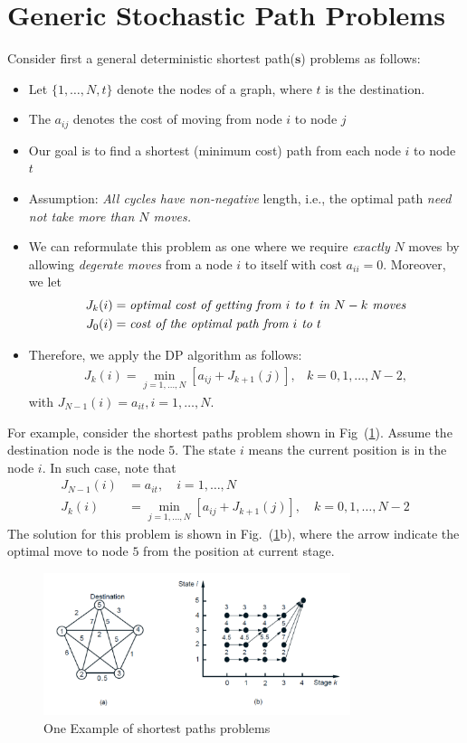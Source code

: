 \section{Generic Stochastic Path Problems}
Consider first a general deterministic shortest path($\bm s$) problems as follows:
\begin{itemize}
\item
Let $\{1,\dots,N,t\}$ denote the nodes of a graph, where $t$ is the destination.
\item
The $a_{ij}$ denotes the cost of moving from node $i$ to node $j$
\item
Our goal is to find a shortest (minimum cost) path from each node $i$ to node $t$
\item
Assumption: \emph{All cycles have non-negative} length, i.e., the optimal path \emph{need not take more than $N$ moves.}
\item
We can reformulate this problem as one where we require \emph{exactly} $N$ moves by allowing \emph{degerate moves} from a node $i$ to itself with cost $a_{ii}=0$. Moreover, we let
\begin{align*}
J_k(i)&=\emph{optimal cost of getting from $i$ to $t$ in $N-k$ moves}\\
J_0(i)&=\emph{cost of the optimal path from $i$ to $t$}
\end{align*}
\item
Therefore, we apply the DP algorithm as follows:
\[
\begin{array}{ll}
J_k(i)=\min_{j=1,\dots,N}\left[a_{ij} + J_{k+1}(j)\right],
&
k=0,1,\dots,N-2,
\end{array}
\]
with $J_{N-1}(i) = a_{it}, i=1,\dots,N$.
\end{itemize}

For example, consider the shortest paths problem shown in Fig~(\ref{fig:2:2}). Assume the destination node is the node $5$. The state $i$ means the current position is in the node $i$. In such case, note that
\begin{align*}
J_{N-1}(i)&=a_{it},\quad i=1,\dots,N\\
J_k(i)&=\min_{j=1,\dots,N}\left[a_{ij}+J_{k+1}(j)\right],\quad k=0,1,\dots,N-2
\end{align*}
The solution for this problem is shown in Fig.~(\ref{fig:2:2}b), where the arrow indicate the optimal move to node $5$ from the position at current stage.
\begin{figure}[H]
\centering
\includegraphics[width=0.8\textwidth]{Forth_lecture/p_1}
\caption{One Example of shortest paths problems}
\label{fig:2:2}
\end{figure}
